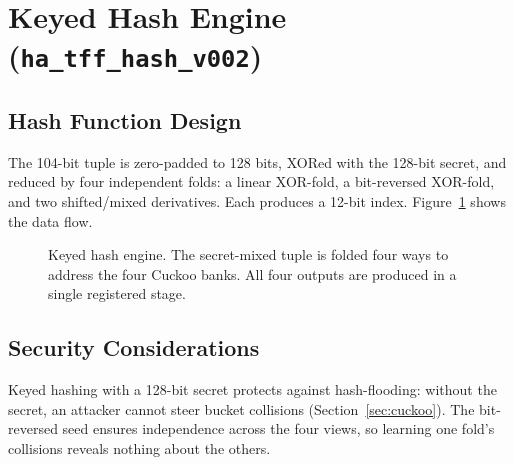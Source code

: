\documentclass[12pt,twoside,openright]{book}
\begin{document}
\section{Keyed Hash Engine (\texttt{ha\_tff\_hash\_v002})}

\subsection{Hash Function Design}

The 104-bit tuple is zero-padded to 128 bits, XORed with the 128-bit secret, and reduced by four
independent folds: a linear XOR-fold, a bit-reversed XOR-fold, and two shifted/mixed derivatives.
Each produces a 12-bit index. Figure~\ref{fig:hashblock} shows the data flow.

\begin{figure}[H]
\centering
\footnotesize
{}
\caption{Keyed hash engine. The secret-mixed tuple is folded four ways to address the four Cuckoo
banks. All four outputs are produced in a single registered stage.}
\label{fig:hashblock}
\end{figure}

\subsection{Security Considerations}

Keyed hashing with a 128-bit secret protects against hash-flooding: without the secret, an attacker
cannot steer bucket collisions (Section~\ref{sec:cuckoo}). The bit-reversed seed ensures independence
across the four views, so learning one fold's collisions reveals nothing about the others.
\end{document}
